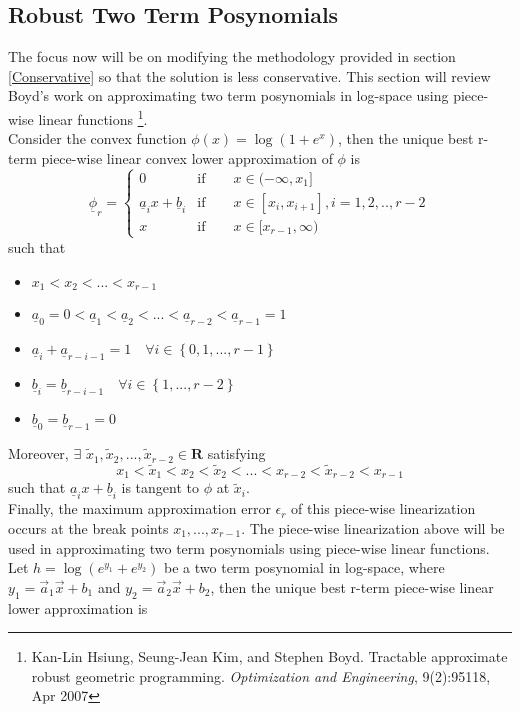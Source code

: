 \subsection{Robust Two Term Posynomials} \label{twoTerm}
The focus now will be on modifying the methodology provided in section \ref{Conservative} so that the solution is less conservative. This section will review Boyd's work on approximating two term posynomials in log-space using piece-wise linear functions \footnote{ Kan-Lin Hsiung, Seung-Jean Kim, and Stephen Boyd. Tractable approximate robust geometric programming. \textit{Optimization and Engineering}, 9(2):95118, Apr 2007}.\\[12pt]
Consider the convex function $\phi(x) = \log(1 + e^x)$, then the unique best r-term piece-wise linear convex lower approximation of $\phi$ is
\begin{equation}
\underline{\phi}_r =
\begin{cases}
0 \qquad &\text{if} \qquad x \in (- \infty, x_1]\\
\underline{a}_ix + \underline{b}_i &\text{if} \qquad x \in [x_i, x_{i+1}], i=1,2,..,r-2\\
x &\text{if} \qquad x \in [x_{r-1}, \infty)
\end{cases}
\label{lower_phi}
\end{equation}
such that
\begin{itemize}
\item $x_1 < x_2 < ... < x_{r-1}$
\item $\underline{a}_0 = 0 < \underline{a}_1 < \underline{a}_2 < ... < \underline{a}_{r-2} < \underline{a}_{r-1} = 1$
\item $\underline{a}_i + \underline{a}_{r-i-1} = 1\quad \forall i \in \left\{0,1, ..., r-1\right\}$
\item $\underline{b}_i = \underline{b}_{r-i-1} \quad \forall i \in \left\{1, ..., r-2\right\}$
\item $\underline{b}_0 = \underline{b}_{r-1} = 0$
\end{itemize}
Moreover, $\exists$ $\tilde{x}_1, \tilde{x}_2, ..., \tilde{x}_{r-2} \in \mathbf{R}$ satisfying
$$
x_1 < \tilde{x}_1 < x_2 < \tilde{x}_2 < ... < x_{r-2} < \tilde{x}_{r-2} < x_{r-1}
$$
such that $\underline{a}_ix + \underline{b}_i$ is tangent to $\phi$ at $\tilde{x}_i$.\\
Finally, the maximum approximation error $\epsilon_r$ of this piece-wise linearization occurs at the break points $x_1, ..., x_{r-1}$. The piece-wise linearization above will be used in approximating two term posynomials using piece-wise linear functions.\\[12pt]
Let $h= \log(e^{y_1} + e^{y_2})$ be a two term posynomial in log-space, where $y_1 = \vec{a}_1\vec{x} + b_1$ and $y_2 = \vec{a}_2\vec{x} + b_2$, then the unique best r-term piece-wise linear lower approximation is

